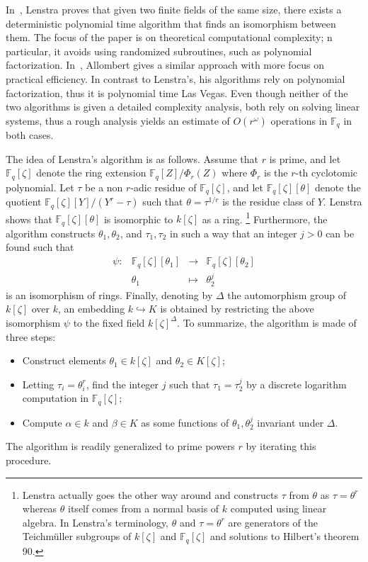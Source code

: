 \documentclass[12pt]{article}
\theoremstyle{plain}
\theoremstyle{definition}
\def\F{\ensuremath{\mathbb{F}}}
\newcounter{algorithm}
\begin{document}
In~\cite{LenstraJr91}, Lenstra proves that 
given two finite fields of the same size, there exists a deterministic polynomial time algorithm 
that finds an isomorphism between them.
The focus of the paper is on theoretical computational complexity;
n particular, it avoids using randomized subroutines, such as polynomial
factorization. 
In~\cite{Allombert02,Allombert02-rev}, Allombert gives a similar approach with more focus on practical efficiency.
In contrast to Lenstra's, his algorithms rely on polynomial factorization, thus it is
polynomial time Las Vegas.
Even though neither of the two algorithms is given a detailed complexity analysis, both rely
on solving linear systems, thus a rough analysis yields an estimate of $O(r^{\omega})$ operations
in $\F_q$ in both cases.

The idea of Lenstra's algorithm is as follows.
Assume that $r$ is prime, and
let $\F_q[\zeta]$ denote the ring extension $\F_q[Z] / \Phi_r(Z)$
where $\Phi_r$ is the $r$-th cyclotomic polynomial.
Let $\tau$ be a non $r$-adic residue of $\F_q[\zeta]$,
and let $\F_q[\zeta][\theta]$ denote the quotient $\F_q[\zeta][Y]/(Y^r - \tau)$
such that $\theta=\tau^{1/r}$ is the residue class of $Y$.
Lenstra shows that $\F_q[\zeta][\theta]$ is isomorphic to $k[\zeta]$ as a ring.%
\footnote{
Lenstra actually goes the other way around and constructs $\tau$ from
$\theta$ as $\tau = \theta^r$
whereas $\theta$ itself comes from a normal basis of $k$
computed using linear algebra.
In Lenstra's terminology, $\theta$ and $\tau=\theta^r$
are generators of the Teichm\"uller subgroups of $k[\zeta]$
and $\F_q[\zeta]$ and solutions to Hilbert's theorem 90.
}
Furthermore, the algorithm constructs $\theta_1, \theta_2$,
and $\tau_1, \tau_2$ in such a way that
an integer $j > 0$  can be found such that
\[
\begin{array}{lrll}
\psi: & \F_q[\zeta][\theta_1] & \rightarrow & \F_q[\zeta][\theta_2] \\
& \theta_1 & \mapsto & \theta_2^j
\end{array}
\]
is an isomorphism of rings.
Finally, denoting by $\Delta$ the automorphism group of $k[\zeta]$
over $k$, an embedding $k \hookrightarrow K$ is obtained by
restricting the above isomorphism $\psi$ to the fixed field
$k[\zeta]^\Delta$.
To summarize, the algorithm is made of three steps:
\begin{itemize}
\item Construct elements $\theta_1\in k[\zeta]$ and $\theta_2\in K[\zeta]$;
\item Letting $\tau_i=\theta_i^r$, find the integer $j$ such that
  $\tau_1=\tau_2^j$ by a discrete logarithm computation in
  $\F_q[\zeta]$;
\item Compute $\alpha\in k$ and $\beta\in K$ as some functions of
  $\theta_1,\theta_2^j$ invariant under $\Delta$.
\end{itemize}
The algorithm is readily generalized to prime powers $r$ by iterating
this procedure.
\end{document}
